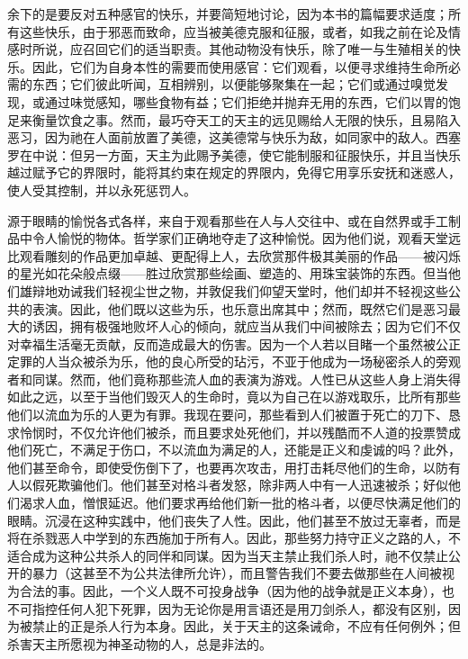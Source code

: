余下的是要反对五种感官的快乐，并要简短地讨论，因为本书的篇幅要求适度；所有这些快乐，由于邪恶而致命，应当被美德克服和征服，或者，如我之前在论及情感时所说，应召回它们的适当职责。其他动物没有快乐，除了唯一与生殖相关的快乐。因此，它们为自身本性的需要而使用感官：它们观看，以便寻求维持生命所必需的东西；它们彼此听闻，互相辨别，以便能够聚集在一起；它们或通过嗅觉发现，或通过味觉感知，哪些食物有益；它们拒绝并抛弃无用的东西，它们以胃的饱足来衡量饮食之事。然而，最巧夺天工的天主的远见赐给人无限的快乐，且易陷入恶习，因为祂在人面前放置了美德，这美德常与快乐为敌，如同家中的敌人。西塞罗在中说：但另一方面，天主为此赐予美德，使它能制服和征服快乐，并且当快乐越过赋予它的界限时，能将其约束在规定的界限内，免得它用享乐安抚和迷惑人，使人受其控制，并以永死惩罚人。\par

源于眼睛的愉悦各式各样，来自于观看那些在人与人交往中、或在自然界或手工制品中令人愉悦的物体。哲学家们正确地夺走了这种愉悦。因为他们说，观看天堂远比观看雕刻的作品更加卓越、更配得上人，去欣赏那件极其美丽的作品——被闪烁的星光如花朵般点缀——胜过欣赏那些绘画、塑造的、用珠宝装饰的东西。但当他们雄辩地劝诫我们轻视尘世之物，并敦促我们仰望天堂时，他们却并不轻视这些公共的表演。因此，他们既以这些为乐，也乐意出席其中；然而，既然它们是恶习最大的诱因，拥有极强地败坏人心的倾向，就应当从我们中间被除去；因为它们不仅对幸福生活毫无贡献，反而造成最大的伤害。因为一个人若以目睹一个虽然被公正定罪的人当众被杀为乐，他的良心所受的玷污，不亚于他成为一场秘密杀人的旁观者和同谋。然而，他们竟称那些流人血的表演为游戏。人性已从这些人身上消失得如此之远，以至于当他们毁灭人的生命时，竟以为自己在以游戏取乐，比所有那些他们以流血为乐的人更为有罪。我现在要问，那些看到人们被置于死亡的刀下、恳求怜悯时，不仅允许他们被杀，而且要求处死他们，并以残酷而不人道的投票赞成他们死亡，不满足于伤口，不以流血为满足的人，还能是正义和虔诚的吗？此外，他们甚至命令，即使受伤倒下了，也要再次攻击，用打击耗尽他们的生命，以防有人以假死欺骗他们。他们甚至对格斗者发怒，除非两人中有一人迅速被杀；好似他们渴求人血，憎恨延迟。他们要求再给他们新一批的格斗者，以便尽快满足他们的眼睛。沉浸在这种实践中，他们丧失了人性。因此，他们甚至不放过无辜者，而是将在杀戮恶人中学到的东西施加于所有人。因此，那些努力持守正义之路的人，不适合成为这种公共杀人的同伴和同谋。因为当天主禁止我们杀人时，祂不仅禁止公开的暴力（这甚至不为公共法律所允许），而且警告我们不要去做那些在人间被视为合法的事。因此，一个义人既不可投身战争（因为他的战争就是正义本身），也不可指控任何人犯下死罪，因为无论你是用言语还是用刀剑杀人，都没有区别，因为被禁止的正是杀人行为本身。因此，关于天主的这条诫命，不应有任何例外；但杀害天主所愿视为神圣动物的人，总是非法的。\par

